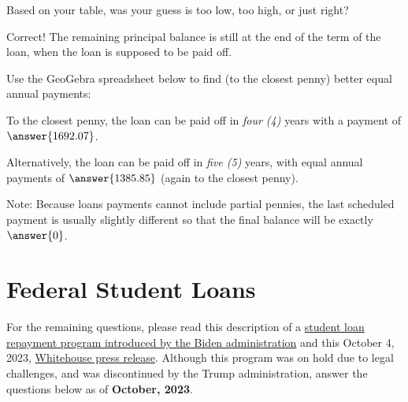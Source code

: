 \documentclass[handout,space,nooutcomes]{ximera}
\begin{document}
\begin{question}
Based on your table, was your guess is too low, too high, or just
right?  
\begin{multipleChoice}
\end{multipleChoice}
\vfill
\begin{question}
Correct!  The remaining principal balance is still  at the end of the term of the loan, when the loan is supposed to be paid off.  

Use the GeoGebra spreadsheet below to find (to the closest penny) better equal annual payments: 
\begin{center}
\end{center}
To the closest penny, the loan can be paid off in \emph{four (4)} years with a payment of $\answer{1692.07}$.  

Alternatively, the loan can be paid off in \emph{five (5)} years, with equal annual payments of $\answer{1385.85}$ (again to the closest penny).  

Note: Because loans payments cannot include partial pennies, the last scheduled payment is usually slightly different so that the final balance will be exactly $\answer{0}$.  
\end{question}
\end{question}

\section*{Federal Student Loans}
For the remaining questions, please read this description of a \href{https://bidenwhitehouse.archives.gov/briefing-room/statements-releases/2023/08/22/fact-sheet-the-biden-harris-administration-launches-the-save-plan-the-most-affordable-student-loan-repayment-plan-ever-to-lower-monthly-payments-for-millions-of-borrowers/}{student loan repayment program introduced by the Biden administration} 
and this October 4, 2023, 
\href{https://bidenwhitehouse.archives.gov/briefing-room/statements-releases/2023/10/04/president-biden-announces-an-additional-9-billion-in-student-debt-relief-for-125000-americans/}{Whitehouse press release}.  Although this program was on hold due to legal challenges, and was discontinued by the Trump administration, 
answer the questions below as of \textbf{October, 2023}.  
\end{document}
